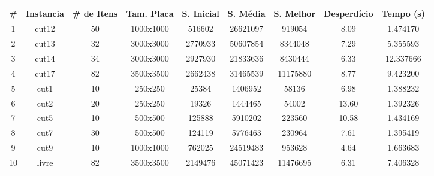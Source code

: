 
\begin{center}
    \begin{tabular}{ |c|c|c|c|c|c|c|c|c|}
    \hline
        \# & Instancia & \# de Itens & Tam. Placa & S. Inicial & S. Média & S. Melhor & Desperdício & Tempo (s) \\ \hline

1 & cut12 & 50 & 1000x1000 & 516602 & 26621097 & 919054 & 8.09 & 1.474170 \\ \hline
2 & cut13 & 32 & 3000x3000 & 2770933 & 50607854 & 8344048 & 7.29 & 5.355593 \\ \hline
3 & cut14 & 34 & 3000x3000 & 2927930 & 21833636 & 8430444 & 6.33 & 12.337666 \\ \hline
4 & cut17 & 82 & 3500x3500 & 2662438 & 31465539 & 11175880 & 8.77 & 9.423200 \\ \hline
5 & cut1 & 10 & 250x250 & 25384 & 1406952 & 58136 & 6.98 & 1.388232 \\ \hline
6 & cut2 & 20 & 250x250 & 19326 & 1444465 & 54002 & 13.60 & 1.392326 \\ \hline
7 & cut5 & 10 & 500x500 & 125888 & 5910202 & 223560 & 10.58 & 1.434169 \\ \hline
8 & cut7 & 30 & 500x500 & 124119 & 5776463 & 230964 & 7.61 & 1.395419 \\ \hline
9 & cut9 & 10 & 1000x1000 & 762025 & 24519483 & 953628 & 4.64 & 1.663683 \\ \hline
10 & livre & 82 & 3500x3500 & 2149476 & 45071423 & 11476695 & 6.31 & 7.406328 \\ \hline

    \end{tabular}
\end{center}

